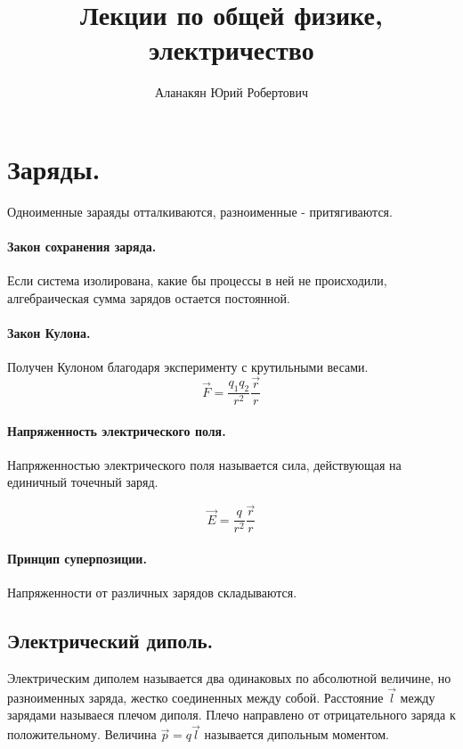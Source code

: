 \documentclass{article}
\author{Аланакян Юрий Робертович}
\title{Лекции по общей физике, электричество}
\begin{document}
    \maketitle
    
    \section*{Заряды.}
    
	Одноименные зараяды отталкиваются, разноименные - притягиваются.
	    
    \paragraph{Закон сохранения заряда.} Если система изолирована, какие бы процессы в ней не происходили, алгебраическая сумма зарядов остается постоянной.
    
    \paragraph{Закон Кулона.} Получен Кулоном благодаря эксперименту с крутильными весами.
    $$ \overrightarrow{F} = \frac{q_1q_2}{r^2} \frac{\overrightarrow{r}}{r} $$
    
    \paragraph{Напряженность электрического поля.} Напряженностью электрического поля называется сила, действующая на единичный точечный заряд.
   
    $$ \overrightarrow{E} = \frac{q}{r^2} \frac{\overrightarrow{r}}{r} $$
   
    \paragraph{Принцип суперпозиции.} Напряженности от различных зарядов складываются.
   
    \subsection*{Электрический диполь.} Электрическим диполем называется два одинаковых по абсолютной величине, но разноименных заряда, жестко соединенных между собой. Расстояние $\overrightarrow{l}$ между зарядами называеся плечом диполя. Плечо направлено от отрицательного заряда к положительному. Величина $\overrightarrow{p} = q\overrightarrow{l}$ называется дипольным моментом.
    
\end{document}
